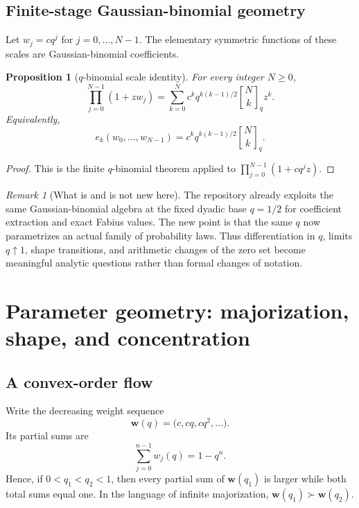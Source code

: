 \documentclass[11pt,oneside]{article}
\newtheorem{proposition}[theorem]{Proposition}
\theoremstyle{definition}
\theoremstyle{remark}
\newtheorem{remark}[theorem]{Remark}
\newcommand{\qbinom}[3]{\genfrac{[}{]}{0pt}{}{#1}{#2}_{#3}}
\begin{document}
\subsection{Finite-stage Gaussian-binomial geometry}

Let $w_j=cq^j$ for $j=0,\ldots,N-1$.  The elementary symmetric functions of these scales are
Gaussian-binomial coefficients.

\begin{proposition}[$q$-binomial scale identity]
\label{prop:qbinomial}
For every integer $N\ge0$,
\begin{equation}
 \prod_{j=0}^{N-1}(1+zw_j)
 =\sum_{k=0}^{N}c^kq^{k(k-1)/2}\qbinom{N}{k}{q}z^k.          \label{eq:q-binomial-scales}
\end{equation}
Equivalently,
\begin{equation}
 e_k(w_0,\ldots,w_{N-1})
 =c^kq^{k(k-1)/2}\qbinom{N}{k}{q}.                           \label{eq:elementary-scales}
\end{equation}
\end{proposition}

\begin{proof}
This is the finite $q$-binomial theorem applied to
$\prod_{j=0}^{N-1}(1+cq^jz)$.
\end{proof}

\begin{remark}[What is and is not new here]
The repository already exploits the same Gaussian-binomial algebra at the fixed dyadic base
$q=1/2$ for coefficient extraction and exact Fabius values.  The new point is that the same
$q$ now parametrizes an actual family of probability laws.  Thus differentiation in $q$,
limits $q\uparrow1$, shape transitions, and arithmetic changes of the zero set become
meaningful analytic questions rather than formal changes of notation.
\end{remark}

\section{Parameter geometry: majorization, shape, and concentration}
\label{sec:geometry}

\subsection{A convex-order flow}

Write the decreasing weight sequence
\[
 \bm w(q)=\bigl(c,cq,cq^2,\ldots\bigr).
\]
Its partial sums are
\[
 \sum_{j=0}^{n-1}w_j(q)=1-q^n.
\]
Hence, if $0<q_1<q_2<1$, then every partial sum of $\bm w(q_1)$ is larger while both total
sums equal one.  In the language of infinite majorization,
\(
 \bm w(q_1)\succ\bm w(q_2).
\)
\end{document}
